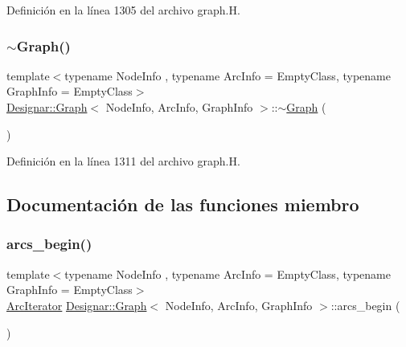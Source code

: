 Definición en la línea 1305 del archivo graph.\+H.

\mbox{\label{class_designar_1_1_graph_a2ea20f9cb46279210e1eadaebcfe27f0}} 
\subsubsection{\texorpdfstring{$\sim$\+Graph()}{~Graph()}}
{\footnotesize\ttfamily template$<$typename Node\+Info , typename Arc\+Info  = Empty\+Class, typename Graph\+Info  = Empty\+Class$>$ \\
\hyperlink{class_designar_1_1_graph}{Designar\+::\+Graph}$<$ Node\+Info, Arc\+Info, Graph\+Info $>$\+::$\sim$\hyperlink{class_designar_1_1_graph}{Graph} (\begin{DoxyParamCaption}{ }\end{DoxyParamCaption})\hspace{0.3cm}{\ttfamily [inline]}}



Definición en la línea 1311 del archivo graph.\+H.



\subsection{Documentación de las funciones miembro}
\mbox{\label{class_designar_1_1_graph_a9448ba557a7b0ef90651d74d4a4ee36b}} 
\subsubsection{\texorpdfstring{arcs\+\_\+begin()}{arcs\_begin()}\hspace{0.1cm}{\footnotesize\ttfamily [1/4]}}
{\footnotesize\ttfamily template$<$typename Node\+Info , typename Arc\+Info  = Empty\+Class, typename Graph\+Info  = Empty\+Class$>$ \\
\hyperlink{class_designar_1_1_graph_1_1_arc_iterator}{Arc\+Iterator} \hyperlink{class_designar_1_1_graph}{Designar\+::\+Graph}$<$ Node\+Info, Arc\+Info, Graph\+Info $>$\+::arcs\+\_\+begin (\begin{DoxyParamCaption}{ }\end{DoxyParamCaption})\hspace{0.3cm}{\ttfamily [inline]}}



